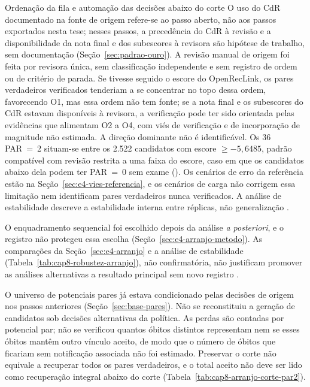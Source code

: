 \begin{chapter}{Ordenação da fila e automação das decisões abaixo do corte}
O uso do CdR documentado na fonte de origem refere-se ao passo aberto, não aos passos exportados nesta tese; nesses passos, a precedência do CdR à revisão e a disponibilidade da nota final e dos subescores à revisora são hipótese de trabalho, sem documentação (Seção~\ref{sec:padrao-ouro}). A revisão manual de origem foi feita por revisora única, sem classificação independente e sem registro de ordem ou de critério de parada. Se tivesse seguido o escore do OpenRecLink, os pares verdadeiros verificados tenderiam a se concentrar no topo dessa ordem, favorecendo O1, mas essa ordem não tem fonte; se a nota final e os subescores do CdR estavam disponíveis à revisora, a verificação pode ter sido orientada pelas evidências que alimentam O2 a O4, com viés de verificação e de incorporação de magnitude não estimada. A direção dominante não é identificável. Os 36 PAR~=~2 situam-se entre os 2.522 candidatos com escore $\geq-5{,}6485$, padrão compatível com revisão restrita a uma faixa do escore, caso em que os candidatos abaixo dela podem ter PAR~=~0 sem exame (). Os cenários de erro da referência estão na Seção~\ref{sec:e4-vies-referencia}, e os cenários de carga não corrigem essa limitação nem identificam pares verdadeiros nunca verificados. A análise de estabilidade descreve a estabilidade interna entre réplicas, não generalização \cite{Jardim2026phdrepo}.

O enquadramento sequencial foi escolhido depois da análise \textit{a posteriori}, e o registro não protegeu essa escolha (Seção~\ref{sec:e4-arranjo-metodo}). As comparações da Seção~\ref{sec:e4-arranjo} e a análise de estabilidade (Tabela~\ref{tab:cap8-robustez-arranjo}), não confirmatória, não justificam promover as análises alternativas a resultado principal sem novo registro \cite{Jardim2026phdrepo}.

O universo de potenciais pares já estava condicionado pelas decisões de origem nos passos anteriores (Seção~\ref{sec:base-pares}). Não se reconstituiu a geração de candidatos sob decisões alternativas da política. As perdas são contadas por potencial par; não se verificou quantos óbitos distintos representam nem se esses óbitos mantêm outro vínculo aceito, de modo que o número de óbitos que ficariam sem notificação associada não foi estimado. Preservar o corte não equivale a recuperar todos os pares verdadeiros, e o total aceito não deve ser lido como recuperação integral abaixo do corte (Tabela~\ref{tab:cap8-arranjo-corte-par2}).


\end{chapter}
